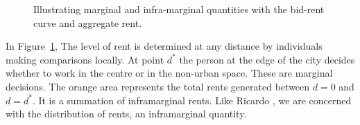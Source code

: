 
\vspace{.3cm}
\begin{figure}[h!t!]
\centering

\caption{Illustrating marginal and infra-marginal quantities with the bid-rent curve and aggregate rent.}
\label{fig-land-rent-as-inframarginal}
\end{figure}

In Figure~\ref{fig-land-rent-as-inframarginal}, The level of rent is determined at any distance by individuals making comparisons locally. At point $d^*$ the person at the edge of the city decides whether to work in the centre or in the non-urban space. These are \gls{marginal} decisions. The orange area represents the total rents generated between $d=0$ and $d=d^*$. It is a summation of \gls{inframarginal} rents. Like Ricardo \cite{ricardoEssayInfluenceLow1815}, we are concerned with the distribution of rents, an inframarginal quantity.





